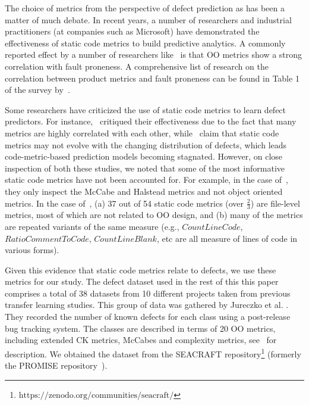 The choice of metrics from the perspective of defect prediction as has been a matter of much debate.  In recent years, a number of researchers and industrial practitioners (at companies such as Microsoft) have demonstrated the effectiveness of  static code metrics to build predictive analytics. A commonly reported effect by a number of researchers like~\citep{al2010object,shatnawi2008effectiveness,madeyski2015process,chidamber1998managerial,menzies07,alves,bener2015lessons,shatnawi,oliveira} is that OO metrics show a strong correlation with fault proneness. A comprehensive list of research on the correlation between product metrics and fault proneness can be found in Table 1 of the survey by~\citep{Rathore2019}.

Some researchers have criticized the use of static code metrics to learn defect predictors. For instance,~\citep{graves2000} critiqued their effectiveness due to the fact that many metrics are highly correlated with each other, while~\citep{rahman2013} claim that static code metrics may not evolve with the changing distribution of defects, which leads code-metric-based prediction models becoming stagnated. However, on close inspection of both these studies, we noted that some of the most informative static code metrics have not been accounted for. For example, in the case of~\citep{graves2000}, they only inspect the McCabe and Halstead metrics and not object oriented metrics. In the case of~\citep{rahman2013}, (a) 37 out of 54 static code metrics (over $\frac{2}{3}$) are file-level metrics, most of which are not related to OO design, and (b) many of the metrics are repeated variants of the same measure (e.g., $CountLineCode$, $RatioCommentToCode$, $CountLineBlank$, etc are all measure of lines of code in various forms).  


Given this evidence that static code metrics relate to defects, we use these metrics for our study. The defect dataset used in the rest of this this paper comprises a total of 38 datasets from 10 different projects taken from previous transfer learning studies. This group of data was gathered by Jureczko et al. \citep{Jureczko2010}. They recorded the number of known defects for each class using a post-release bug tracking system. The classes are described in terms of 20 OO metrics, including extended CK metrics, McCabes and complexity metrics, see~ for description. We obtained the dataset from the SEACRAFT repository\footnote{$\text{https://zenodo.org/communities/seacraft/}$} (formerly the PROMISE repository~\citep{menzies2016promise}). 

